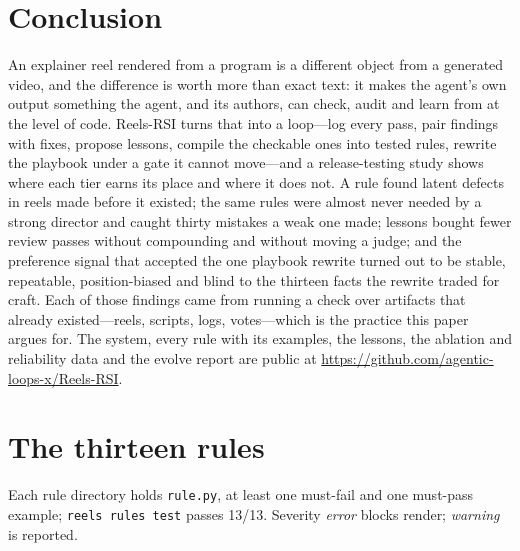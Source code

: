 \documentclass[11pt]{article}
\newcommand{\sys}{Reels-RSI}
\begin{document}
\section{Conclusion}
An explainer reel rendered from a program is a different object from a generated video, and the
difference is worth more than exact text: it makes the agent's own output something the agent, and
its authors, can check, audit and learn from at the level of code. \sys{} turns that into a
loop---log every pass, pair findings with fixes, propose lessons, compile the checkable ones into
tested rules, rewrite the playbook under a gate it cannot move---and a release-testing study shows
where each tier earns its place and where it does not. A rule found latent defects in reels made
before it existed; the same rules were almost never needed by a strong director and caught thirty mistakes a weak one
made;
lessons
bought fewer review passes without compounding and without moving a judge; and the preference
signal that accepted the one playbook rewrite turned out to be stable, repeatable, position-biased
and blind to the thirteen facts the rewrite traded for craft. Each of those findings came from
running a check over artifacts that already existed---reels, scripts, logs, votes---which is the
practice this paper argues for. The system, every rule with its examples, the lessons, the ablation
and reliability data and the evolve report are public at
\url{https://github.com/agentic-loops-x/Reels-RSI}.




\appendix
\section{The thirteen rules}
\label{app:rules}
Each rule directory holds \texttt{rule.py}, at least one must-fail and one must-pass example;
\texttt{reels rules test} passes 13/13. Severity \emph{error} blocks render; \emph{warning} is
reported.
\end{document}
